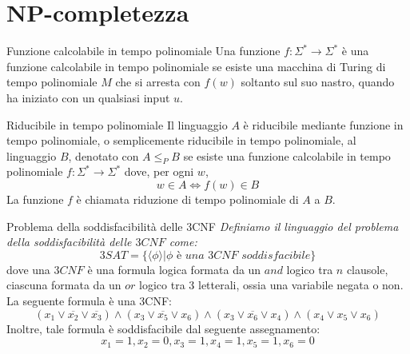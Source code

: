 \section{NP-completezza}
\begin{Definition}{Funzione calcolabile in tempo polinomiale}{}
Una funzione $f:\Sigma^*\to\Sigma^*$ è una funzione calcolabile in tempo polinomiale se esiste una macchina di Turing di tempo polinomiale $M$ che si arresta con $f(w)$ soltanto sul suo nastro, quando ha iniziato con un qualsiasi input $u$.    
\end{Definition}

\begin{Definition}{Riducibile in tempo polinomiale}{}
Il linguaggio $A$ è riducibile mediante funzione in tempo polinomiale, o semplicemente riducibile in tempo polinomiale, al linguaggio $B$, denotato con $A \leq_P B$ se esiste una funzione calcolabile in tempo polinomiale $f : \Sigma^*\longrightarrow\Sigma^*$ dove, per ogni $w$,
\begin{equation*}
    w \in A \iff f(w) \in B    
\end{equation*}
La funzione $f$ è chiamata riduzione di tempo polinomiale di $A$ a $B$.
\end{Definition}

\begin{Example}{Problema della soddisfacibilità delle 3CNF}{}
\textit{Definiamo il linguaggio del problema della soddisfacibilità delle $3CNF$ come:}
\begin{equation*}
    3SAT = \{\langle \phi\rangle | \phi\textit{ è una }3CNF\textit{ soddisfacibile}\}
\end{equation*}
dove una $3CNF$ è una formula logica formata da un $and$ logico tra $n$ clausole, ciascuna
formata da un $or$ logico tra 3 letterali, ossia una variabile negata o non. La seguente formula è una 3CNF:
\begin{equation*}
    (x_1 \lor \overline{x_2} \lor \overline{x_3}) \land (x_3 \lor \overline{x_5} \lor x_6) \land (x_3 \lor \overline{x_6} \lor x_4) \land (x_4 \lor x_5 \lor x_6)
\end{equation*}
Inoltre, tale formula è soddisfacibile dal seguente assegnamento:
\begin{equation*}
    x_1 = 1, x_2 = 0, x_3 = 1, x_4 = 1, x_5 = 1, x_6 = 0    
\end{equation*}
\end{Example}


